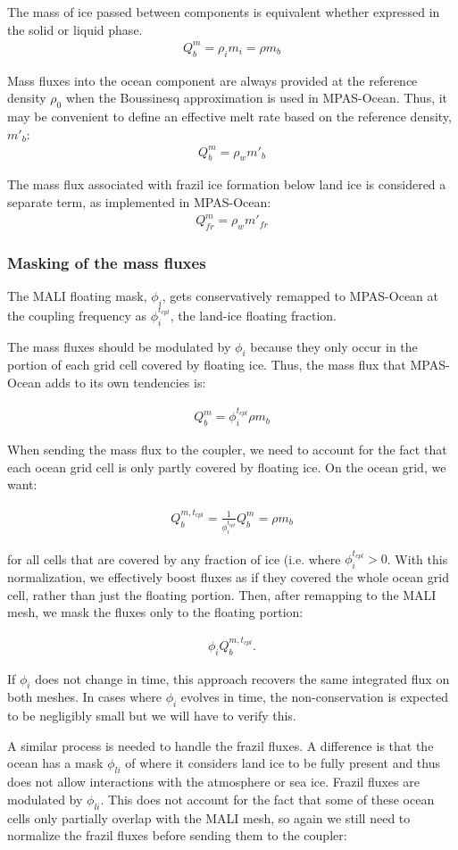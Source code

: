 \documentclass[11pt]{report}
\newcommand{\bea}{\begin{eqnarray}}
\newcommand{\eea}{\end{eqnarray}}
\begin{document}
The mass of ice passed between components is equivalent whether expressed in the solid or liquid phase.
\bea
    Q_b^m = \rho_i m_i = \rho m_b
\eea

Mass fluxes into the ocean component are always provided at the reference density $\rho_0$ when the Boussinesq approximation is used in MPAS-Ocean. Thus, it may be convenient to define an effective melt rate based on the reference density, $m'_b$:
\bea
    Q_b^m = \rho_w m'_b
\eea

The mass flux associated with frazil ice formation below land ice is considered a separate term, as implemented in MPAS-Ocean:
\bea
    Q_{fr}^m = \rho_w m'_{fr}
\eea


\subsubsection{Masking of the mass fluxes}

The MALI floating mask, $\phi_i$, gets conservatively remapped to MPAS-Ocean at the coupling frequency as $\phi_i^{t_{cpl}}$, the land-ice floating fraction.

The mass fluxes should be modulated by $\phi_i$ because they only occur in the portion of each grid cell covered by floating ice.  Thus, the mass flux that MPAS-Ocean adds to its own tendencies is:

\bea
    Q_b^m = \phi_i^{t_{cpl}} \rho m_b
\eea

When sending the mass flux to the coupler, we need to account for the fact that each ocean grid cell is only partly covered by floating ice.  On the ocean grid, we want:

\bea
    Q_b^{m,t_{cpl}} = \frac{1}{\phi_i^{t_{cpl}}} Q_b^m = \rho m_b
\eea

for all cells that are covered by any fraction of ice (i.e. where $\phi_i^{t_{cpl}} > 0$.  With this normalization, we effectively boost fluxes as if they covered the whole ocean grid cell, rather than just the floating portion. Then, after remapping to the MALI mesh, we mask the fluxes only to the floating portion:

\bea
    \phi_i Q_b^{m,t_{cpl}}.
\eea

If $\phi_i$ does not change in time, this approach recovers the same integrated flux on both meshes.  In cases where $\phi_i$ evolves in time, the non-conservation is expected to be negligibly small but we will have to verify this.

A similar process is needed to handle the frazil fluxes. A difference is that the ocean has a mask $\phi_{li}$ of where it considers land ice to be fully present and thus does not allow interactions with the atmosphere or sea ice.  Frazil fluxes are modulated by $\phi_{li}$.  This does not account for the fact that some of these ocean cells only partially overlap with the MALI mesh, so again we still need to normalize the frazil fluxes before sending them to the coupler:
\end{document}
